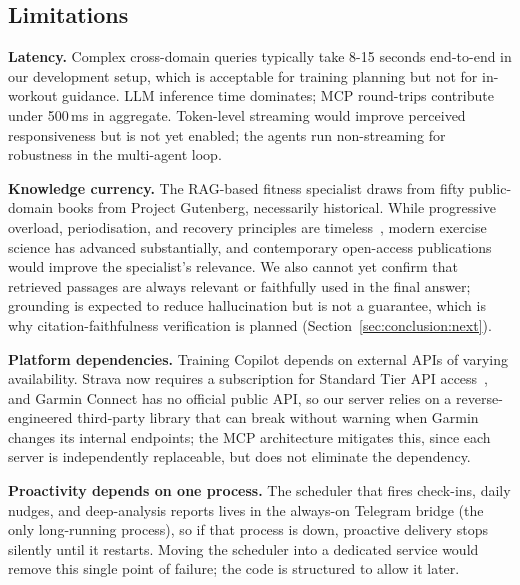 

\subsection{Limitations}\label{sec:discussion:limitations}

\textbf{Latency.} Complex cross-domain queries typically take 8-15 seconds end-to-end in our development setup, which is acceptable for training planning but not for in-workout guidance. LLM inference time dominates; MCP round-trips contribute under 500\,ms in aggregate. Token-level streaming would improve perceived responsiveness but is not yet enabled; the agents run non-streaming for robustness in the multi-agent loop.

\textbf{Knowledge currency.} The RAG-based fitness specialist draws from fifty public-domain books from Project Gutenberg, necessarily historical. While progressive overload, periodisation, and recovery principles are timeless~\citep{grgic_periodization_2017}, modern exercise science has advanced substantially, and contemporary open-access publications would improve the specialist's relevance. We also cannot yet confirm that retrieved passages are always relevant or faithfully used in the final answer; grounding is expected to reduce hallucination but is not a guarantee, which is why citation-faithfulness verification is planned (Section~\ref{sec:conclusion:next}).

\textbf{Platform dependencies.} Training Copilot depends on external APIs of varying availability. Strava now requires a subscription for Standard Tier API access~\citep{strava_api_update_2026}, and Garmin Connect has no official public API, so our server relies on a reverse-engineered third-party library that can break without warning when Garmin changes its internal endpoints; the MCP architecture mitigates this, since each server is independently replaceable, but does not eliminate the dependency.

\textbf{Proactivity depends on one process.} The scheduler that fires check-ins, daily nudges, and deep-analysis reports lives in the always-on Telegram bridge (the only long-running process), so if that process is down, proactive delivery stops silently until it restarts. Moving the scheduler into a dedicated service would remove this single point of failure; the code is structured to allow it later.

